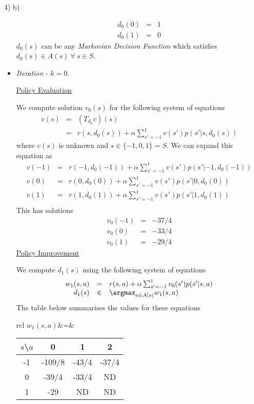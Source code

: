 \documentclass[11pt,a4paper]{article}
\begin{document}
\begin{answer}{4) b)}
\begin{itemize}
\[\begin{array}{rcl}
      d_0(0)&=&1\\
      d_0(1)&=&0
    \end{array}\]
    $d_0(s)$ can be any \textit{Markovian Decision Function} which satisfies $d_0(s)\in A(s)\ \forall\ s\in S$.
    \item \textit{Iteration} - $k=0$.
    \par \underline{Policy Evaluation}
    \par We compute solution $v_0(s)$ for the following system of equations
    \[\begin{array}{rcl}
      v(s)&=&(T_{d_0}v)(s)\\
      &=&r(s,d_0(s))+\alpha\sum_{s'=-1}^1v(s')p(s'|s,d_0(s))
    \end{array}\]
    where $v(s)$ is unknown and $s\in\{-1,0,1\}=S$. We can expand this equation as
    \[\begin{array}{rcl}
      v(-1)&=&r(-1,d_0(-1))+\alpha\sum_{s'=-1}^1v(s')p(s'|-1,d_0(-1))\\
      v(0)&=&r(0,d_0(0))+\alpha\sum_{s'=-1}^1v(s')p(s'|0,d_0(0))\\
      v(1)&=&r(1,d_0(1))+\alpha\sum_{s'=-1}^1v(s')p(s'|1,d_0(1))\\
    \end{array}\]
    This has solutions
    \[\begin{array}{rcl}
      v_0(-1)&=&-37/4\\
      v_0(0)&=&-33/4\\
      v_0(1)&=&-29/4
    \end{array}\]
    \underline{Policy Improvement}
    \par We compute $d_1(s)$ using the following system of equations
    \[\begin{array}{rcl}
      w_1(s,a)&=&r(s,a)+\alpha\sum_{s'=-1}^1v_0(s')p(s'|s,a)\\
      d_1(s)&\in&\argmax_{a\in A(s)}w_1(s,a)
    \end{array}\]
    The table below summarises the values for these equations
    \begin{center}
      \begin{tabular}{rcl}
        $w_1(s,a)$&=&\begin{tabular}{c|ccc}
          $s$\textbackslash$a$&0&1&2\\\hline
          -1&-109/8&-43/4&-37/4\\
          0&-39/4&-33/4&ND\\
          1&-29&ND&ND
        \end{tabular}\\

\end{tabular}
\end{center}
\end{itemize}
\end{answer}
\end{document}
